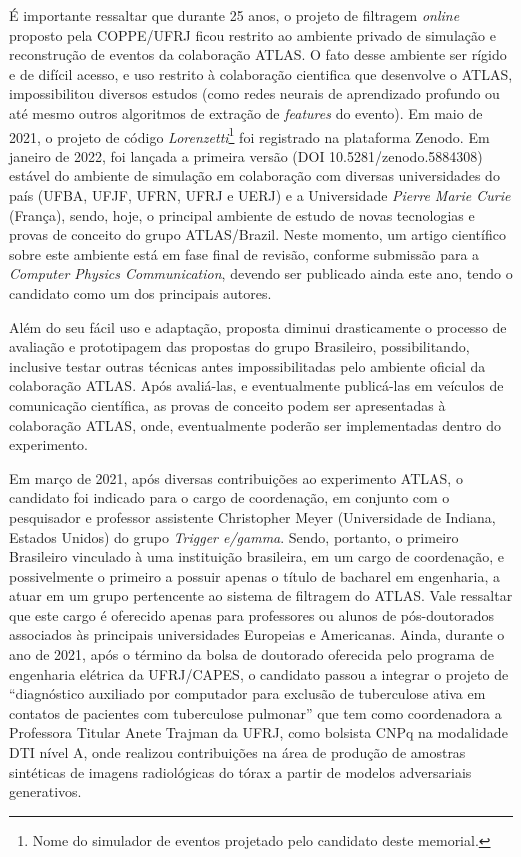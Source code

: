 É importante ressaltar que durante 25 anos, o projeto de filtragem \emph{online} proposto pela COPPE/UFRJ 
ficou restrito ao ambiente privado de simulação e reconstrução de eventos da colaboração ATLAS. 
O fato desse ambiente ser rígido e de difícil acesso, e uso restrito à colaboração cientifica que 
desenvolve o ATLAS, impossibilitou diversos estudos (como redes neurais de aprendizado profundo 
ou até mesmo outros algoritmos de extração de \emph{features} do evento). Em maio de 2021, o projeto de 
código \emph{Lorenzetti}\footnote{Nome do simulador de eventos projetado pelo candidato deste memorial.} 
foi registrado na plataforma Zenodo. Em janeiro de 2022, foi lançada a primeira 
versão (DOI 10.5281/zenodo.5884308) estável do ambiente de simulação em colaboração com diversas 
universidades do país (UFBA, UFJF, UFRN, UFRJ e UERJ) e a Universidade \emph{Pierre Marie Curie} (França), 
sendo, hoje, o principal ambiente de estudo de novas tecnologias e provas de conceito do grupo ATLAS/Brazil. 
Neste momento, um artigo científico sobre este ambiente está em fase final de revisão, conforme submissão 
para a \emph{Computer Physics Communication}, devendo ser publicado ainda este ano, tendo o candidato 
como um dos principais autores.


Além do seu fácil uso e adaptação, proposta diminui drasticamente o processo de avaliação e prototipagem 
das propostas do grupo Brasileiro, possibilitando, inclusive testar outras técnicas antes impossibilitadas 
pelo ambiente oficial da colaboração ATLAS. Após avaliá-las, e eventualmente publicá-las em veículos de 
comunicação científica, as provas de conceito podem ser apresentadas à colaboração ATLAS, onde, eventualmente 
poderão ser implementadas dentro do experimento.


Em março de 2021, após diversas contribuições ao experimento ATLAS, o candidato foi indicado para o cargo de 
coordenação, em conjunto com o pesquisador e professor assistente Christopher Meyer (Universidade de 
Indiana, Estados Unidos) do grupo \emph{Trigger e/gamma}. Sendo, portanto, o primeiro Brasileiro vinculado à uma 
instituição brasileira, em um cargo 
de coordenação, e possivelmente o primeiro a possuir apenas o título de bacharel em engenharia, a atuar em um 
grupo pertencente ao sistema de filtragem do ATLAS. Vale ressaltar que este cargo é oferecido apenas para 
professores ou alunos de pós-doutorados associados às principais universidades Europeias e Americanas. 
Ainda, durante o ano de 2021, após o término da bolsa de doutorado oferecida pelo programa de engenharia 
elétrica da UFRJ/CAPES, o candidato passou a integrar o projeto de “diagnóstico auxiliado por computador 
para exclusão de tuberculose ativa em contatos de pacientes com tuberculose pulmonar” que tem como 
coordenadora a Professora Titular Anete Trajman da UFRJ, como bolsista CNPq na modalidade DTI nível A, onde 
realizou contribuições na área de produção de amostras sintéticas de imagens radiológicas do tórax a partir 
de modelos adversariais generativos.



